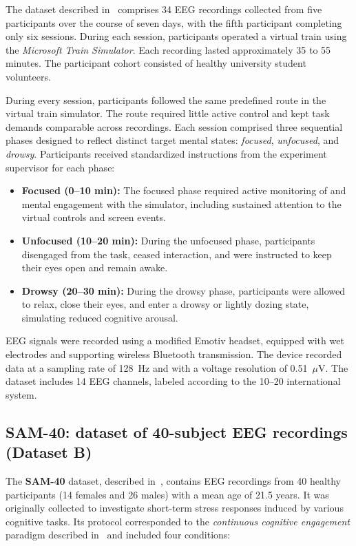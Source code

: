 \documentclass[10pt,letterpaper]{article}
\begin{document}
The dataset described in~\cite{aci2019attention} comprises 34 EEG recordings collected from five participants over the course of seven days, with the fifth participant completing only six sessions. During each session, participants operated a virtual train using the \textit{Microsoft Train Simulator}. Each recording lasted approximately 35 to 55 minutes. The participant cohort consisted of healthy university student volunteers.

During every session, participants followed the same predefined route in the virtual train simulator. The route required little active control and kept task demands comparable across recordings. Each session comprised three sequential phases designed to reflect distinct target mental states: \textit{focused}, \textit{unfocused}, and \textit{drowsy}. Participants received standardized instructions from the experiment supervisor for each phase:

\begin{itemize}
  \item \textbf{Focused (0--10 min):} The focused phase required active monitoring of and mental engagement with the simulator, including sustained attention to the virtual controls and screen events.
  \item \textbf{Unfocused (10--20 min):} During the unfocused phase, participants disengaged from the task, ceased interaction, and were instructed to keep their eyes open and remain awake.
  \item \textbf{Drowsy (20--30 min):} During the drowsy phase, participants were allowed to relax, close their eyes, and enter a drowsy or lightly dozing state, simulating reduced cognitive arousal.
\end{itemize}

EEG signals were recorded using a modified Emotiv headset, equipped with wet electrodes and supporting wireless Bluetooth transmission. The device recorded data at a sampling rate of 128~Hz and with a voltage resolution of 0.51~$\mu$V. The dataset includes 14 EEG channels, labeled according to the 10--20 international system.

\subsection*{SAM-40: dataset of 40-subject EEG recordings (Dataset B)}

The \textbf{SAM-40} dataset, described in~\cite{ghosh2022sam40}, contains EEG recordings from 40 healthy participants (14 females and 26 males) with a mean age of 21.5 years. It was originally collected to investigate short-term stress responses induced by various cognitive tasks. Its protocol corresponded to the \textit{continuous cognitive engagement} paradigm described in~\cite{chen2025hybrid} and included four conditions:
\end{document}
